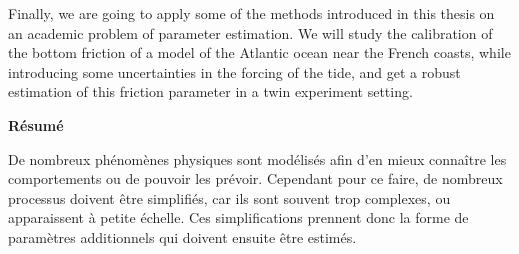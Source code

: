 Finally, we are going to apply some of the methods introduced in this
thesis on an academic problem of parameter estimation. We will study
the calibration of the bottom friction of a model of the Atlantic
ocean near the French coasts, while introducing some uncertainties in
the forcing of the tide, and get a robust estimation of this friction
parameter in a twin experiment setting.



%
%
%

\vspace{0.5cm}
\vfill
\etoile
\vfill
\vspace{0.5cm}
\begin{center}
  \bf Résumé
\end{center}
\vspace{0.3cm}
De nombreux phénomènes physiques sont modélisés afin
d'en mieux connaître les comportements ou de pouvoir les
prévoir. Cependant pour ce faire, de nombreux processus doivent être
simplifiés, car ils sont souvent trop complexes, ou apparaissent à
petite échelle. Ces simplifications prennent donc la forme de
paramètres additionnels qui doivent ensuite être estimés.

